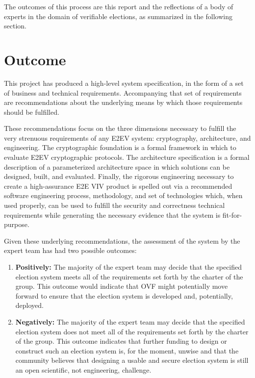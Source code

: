 The outcomes of this process are this report and the reflections of a
body of experts in the domain of verifiable elections, as summarized
in the following section.

\section{Outcome}
\label{sec:outcome}

This project has produced a high-level system specification, in the
form of a set of business and technical requirements.  Accompanying
that set of requirements are recommendations about the underlying
means by which those requirements should be fulfilled.  

These recommendations focus on the three dimensions necessary to
fulfill the very strenuous requirements of any E2EV system:
cryptography, architecture, and engineering.  The cryptographic
foundation is a formal framework in which to evaluate E2EV
cryptographic protocols.  The architecture specification is a formal
description of a parameterized architecture space in which solutions
can be designed, built, and evaluated.  Finally, the rigorous
engineering necessary to create a high-assurance E2E VIV product is
spelled out via a recommended software engineering process,
methodology, and set of technologies which, when used properly, can be
used to fulfill the security and correctness technical requirements
while generating the necessary evidence that the system is
fit-for-purpose.

Given these underlying recommendations, the assessment of the system
by the expert team has had two possible outcomes:
\begin{enumerate}
\item \textbf{Positively:} The majority of the expert team may decide
  that the specified election system meets all of the requirements set
  forth by the charter of the group. This outcome would indicate that
  OVF might potentially move forward to ensure that the election
  system is developed and, potentially, deployed.
\item \textbf{Negatively:} The majority of the expert team may decide
  that the specified election system does not meet all of the
  requirements set forth by the charter of the group. This outcome
  indicates that further funding to design or construct such an
  election system is, for the moment, unwise and that the community
  believes that designing a usable and secure election system is still
  an open scientific, not engineering, challenge.
\end{enumerate}

